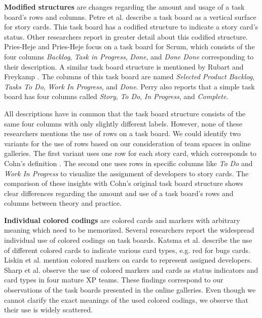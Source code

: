 \documentclass{llncs}
\begin{document}
\textbf{Modified structures} are changes regarding the amount and usage of a task board's rows and columns.
Petre et al. \cite{Petre.2012} describe a task board as a vertical surface for 
story cards. This task board has a codified structure to indicate a story 
card's status. Other researchers \cite{PriesHeje.2011, Rubart.2009, Perry.2008} 
report in greater detail about this codified structure. Pries-Heje and 
Pries-Heje \cite{PriesHeje.2011} focus on a task board for Scrum, which 
consists of the four columns \textit{Backlog}, \textit{Task in Progress}, 
\textit{Done}, and \textit{Done Done} corresponding to their description. A 
similar task board structure is mentioned by Rubart and Freykamp 
\cite{Rubart.2009}. The columns of this task board are named \textit{Selected 
Product Backlog}, \textit{Tasks To Do}, \textit{Work In Progress}, and 
\textit{Done}. Perry \cite{Perry.2008} also reports that a simple task board 
has four columns called \textit{Story}, \textit{To Do}, \textit{In Progress}, 
and \textit{Complete}.

All descriptions have in common that the task board structure consists of the 
same four columns with only slightly different labels. However, none of these 
researchers mentions the use of rows on a task board. We could identify two 
variants for the use of rows based on our consideration of team spaces in 
online galleries. The first variant uses one row for each story card, which 
corresponds to Cohn's definition \cite{Cohn.2012}. The second one uses rows 
in specific columns like \textit{To Do} and \textit{Work In Progress} to 
visualize the assignment of developers to story cards. The comparison of these 
insights with Cohn's original task board structure \cite{Cohn.2012} shows clear 
differences regarding the amount and use of a task board's rows and columns 
between theory and practice.

\textbf{Individual colored codings} are colored cards and markers with 
arbitrary meaning which need to be memorized.
Several researchers report the widespread individual use of colored codings on 
task boards. Katsma et al. \cite{Katsma.2013} describe the use of different 
colored cards to indicate various card types, e.g. red for bugs cards. Liskin 
et al. \cite{Liskin.2014} mention colored markers on cards to represent 
assigned developers. Sharp et al. \cite{Sharp.2006, Sharp.2008, Sharp.2009} 
observe the use of colored markers and cards as status indicators and card 
types in four mature XP teams. These findings correspond to our observations of 
the task boards presented in the online galleries. Even though we cannot 
clarify the exact meanings of the used colored codings, we observe that their 
use is widely scattered.
\end{document}

